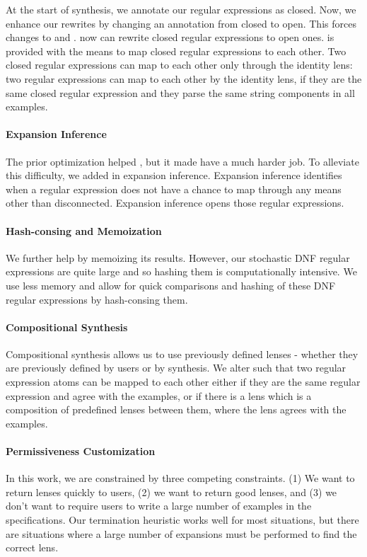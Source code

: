 \documentclass[acmsmall,screen,anonymous]{acmart}
\begin{document}
At the start of synthesis, we annotate our regular expressions as closed. Now,
we enhance our rewrites by changing an annotation from closed to open. This
forces changes to \RXSearch and \GreedySynth. \RXSearch now can rewrite closed
regular expressions to open ones. \GreedySynth is provided with the means to map
closed regular expressions to each other. Two closed regular expressions can map
to each other only through the identity lens: two regular expressions can map to
each other by the identity lens, if they are the same closed regular expression
and they parse the same string components in all examples.

\paragraph*{Expansion Inference} The prior optimization helped \GreedySynth, but
it made \RXSearch have a much harder job.  To alleviate this difficulty, we
added in expansion inference.  Expansion inference identifies when a regular
expression does not have a chance to map through any means other than
disconnected.  Expansion inference opens those regular expressions.

\paragraph*{Hash-consing and Memoization} We further help \GreedySynth by
memoizing its results.  However, our stochastic DNF regular expressions are
quite large and so hashing them is computationally intensive.  We use less
memory and allow for quick comparisons and hashing of these DNF regular
expressions by hash-consing them.

\paragraph*{Compositional Synthesis} Compositional synthesis allows us to use
previously defined lenses - whether they are previously defined by users or by
synthesis. We alter \GreedySynth such that two regular expression atoms can be
mapped to each other either if they are the same regular expression and agree
with the examples, or if there is a lens which is a composition of predefined
lenses between them, where the lens agrees with the examples.

\paragraph*{\RXSearch Permissiveness Customization}
In this work, we are constrained by three competing constraints. (1) We want to
return lenses quickly to users, (2) we want to return good lenses, and (3) we
don't want to require users to write a large number of examples in the
specifications. Our termination heuristic works well for most situations, but
there are situations where a large number of expansions must be performed to
find the correct lens.
\end{document}
